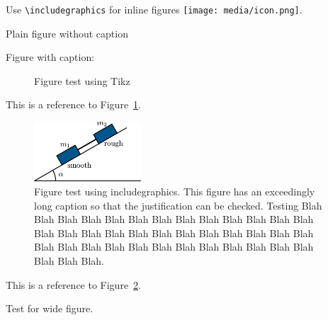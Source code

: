\documentclass[solutionsatend]{ouunit}
\begin{document}
Use \verb"\includegraphics" for inline figures \texttt{[image: media/icon.png]}.


Plain figure without caption

\begin{figure}
\end{figure}

Figure with caption:
\begin{figure}
\caption{Figure test using Tikz}
\label{fig-test-tikz}
\end{figure}

This is a reference to Figure~\ref{fig-test-tikz}.

\begin{figure}
\caption{Figure test using includegraphics\label{fig-test-includegraphics}. This figure has an exceedingly long caption so that the justification can be checked. Testing Blah Blah Blah Blah Blah Blah Blah Blah Blah Blah Blah Blah Blah Blah Blah Blah Blah Blah Blah Blah Blah Blah Blah Blah Blah Blah Blah Blah Blah Blah Blah Blah Blah Blah Blah Blah Blah Blah Blah Blah.}
\includegraphics[width=4cm]{test}
\end{figure}
This is a reference to Figure~\ref{fig-test-includegraphics}.

Test for wide figure.

\begin{widefigure}
\caption{Widefigure test\label{fig-test-widefigure-one}}
\end{widefigure}
\end{document}
